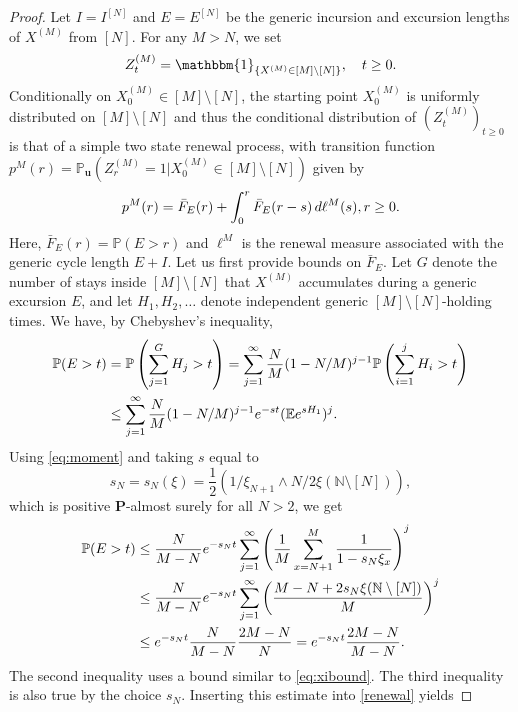 \documentclass[11pt,a4paper]{scrartcl}
\numberwithin{equation}{section}
\theoremstyle{plain}
\theoremstyle{definition}
\theoremstyle{remark}
\newcommand{\bE}{\ensuremath{\mathbb{E}}}
\newcommand{\bN}{\ensuremath{\mathbb{N}}}
\newcommand{\bP}{\ensuremath{\mathbb{P}}}
\newcommand{\ind}{\ensuremath{\mathbbm{1}}}
\newcommand{\di}{\,\textup{d}}
\newcommand{\bPu}{\bP_\mathbf{u}}
\newcommand{\bfP}{\mathbf{P}}
\begin{document}
\begin{proof}
Let $I=I^{[N]}$ and $E=E^{[N]}$  be the generic incursion and excursion lengths of $X^{(M)}$ from $[N]$. For any $M>N$, we set
$$
Z_t^{(M)}=\ind_{\{ X^{(M)}\in [M]\setminus[N] \}}, \quad t\geq 0.
$$
Conditionally on $X_0^{(M)}\in[M]\setminus [N]$, the starting point $X_0^{(M)}$ is uniformly distributed on $[M]\setminus [N]$ and thus the conditional distribution of $(Z_t^{(M)})_{t\geq 0}$ is that of a simple two state renewal process, with transition function $p^M(r)=\bPu(Z_r^{(M)}=1|X_0^{(M)}\in[M]\setminus [N])$ given by
\begin{equation}\label{renewal}
p^M(r)=\bar{F}_{E}(r)+\int_{0}^r \bar{F}_{E}(r-s) \di \ell^{M}(s), r\geq 0.
\end{equation}
Here, $\bar{F}_{E}(r)=\bP(E>r)$ and $\ell^{M}$ is the renewal measure associated with the generic cycle length $E+I$. Let us first provide bounds on $\bar F_E$. Let $G$ denote the number of stays inside $[M]\setminus [N]$ that $X^{(M)}$ accumulates during a generic excursion $E$, and let $H_1,H_2,\dots$ denote independent generic $[M]\setminus [N]$-holding times. %
We have, by Chebyshev's inequality,
\begin{align*}
	\bP(E>t) &= \bP\left(\sum_{j=1}^{G} H_j>t\right) = \sum_{j=1}^{\infty}\frac{N}{M}(1-N/M)^{j-1}\bP\left(\sum_{i=1}^j H_i>t \right) \\ 
	&\leq \sum_{j=1}^{\infty}\frac{N}{M}(1-N/M)^{j-1}\textup{e}^{-st}(\bE\textup{e}^{s H_1})^j.
\end{align*} 
Using \eqref{eq:moment} and taking $s$ equal to   $$s_N=s_N(\xi)=\frac{1}{2}\left(1/\xi_{N+1} \wedge N/2\xi(\bN\setminus[N])\right),$$
which is positive $\bfP$-almost surely for all $N>2$, we get
\begin{align*}
	\bP(E>t) &\leq \frac{N}{M-N} \textup{e}^{-s_Nt}\sum_{j=1}^{\infty}\left(\frac{1}{M}\sum_{x=N+1}^M \frac{1}{1-s_N\xi_x} \right)^j\\
	&\leq \frac{N}{M-N} \textup{e}^{-s_Nt}\sum_{j=1}^{\infty}\left(\frac{M-N+2s_N\xi(\bN\setminus[N])}{M} \right)^j\\
	& \leq \textup{e}^{-s_Nt} \frac{N}{M-N} \frac{2M-N}{N}=\textup{e}^{-s_Nt}\frac{2M-N}{M-N}.
\end{align*} 
The second inequality uses a bound similar to \eqref{eq:xibound}. The third inequality is also true by the choice $s_N$.  Inserting this estimate into \eqref{renewal} yields

\end{proof}
\end{document}
